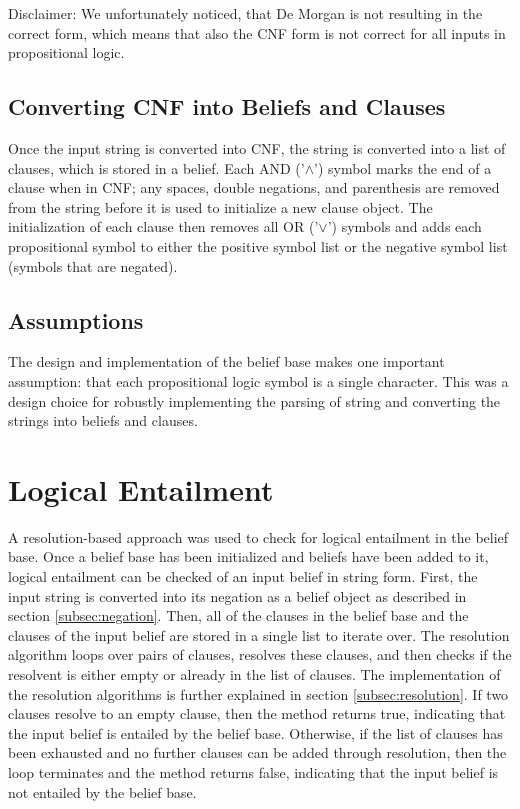 \documentclass[a4paper,10pt]{article}
\begin{document}
Disclaimer: We unfortunately noticed, that De Morgan is not resulting in the correct form, which means that also the CNF form is not correct for all inputs in propositional logic. 

\subsection{Converting CNF into Beliefs and Clauses}
\label{subsec:implementation}
Once the input string is converted into CNF, the string is converted into a list of clauses, which is stored in a belief. Each AND ('$\wedge$') symbol marks the end of a clause when in CNF; any spaces, double negations, and parenthesis are removed from the string before it is used to initialize a new clause object. The initialization of each clause then removes all OR ('$\vee$') symbols and adds each propositional symbol to either the positive symbol list or the negative symbol list (symbols that are negated).

\subsection{Assumptions}
\label{subsec:assumptions}
The design and implementation of the belief base makes one important assumption: that each propositional logic symbol is a single character. This was a design choice for robustly implementing the parsing of string and converting the strings into beliefs and clauses.

\section{Logical Entailment}
\label{sec:entail}
A resolution-based approach was used to check for logical entailment in the belief base. Once a belief base has been initialized and beliefs have been added to it, logical entailment can be checked of an input belief in string form. First, the input string is converted into its negation as a belief object as described in section \ref{subsec:negation}. Then, all of the clauses in the belief base and the clauses of the input belief are stored in a single list to iterate over. The resolution algorithm loops over pairs of clauses, resolves these clauses, and then checks if the resolvent is either empty or already in the list of clauses. The implementation of the resolution algorithms is further explained in section \ref{subsec:resolution}. If two clauses resolve to an empty clause, then the method returns true, indicating that the input belief is entailed by the belief base. Otherwise, if the list of clauses has been exhausted and no further clauses can be added through resolution, then the loop terminates and the method returns false, indicating that the input belief is not entailed by the belief base.
\end{document}
